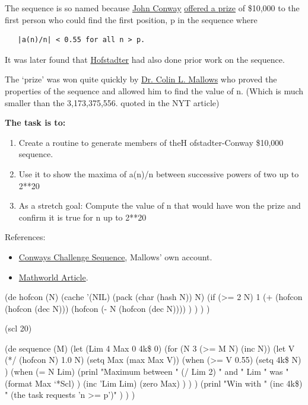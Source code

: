 \begin{itemize}
The sequence is so named because
\href{http://en.wikipedia.org/wiki/John\_Horton\_Conway}{John Conway}
\href{http://www.nytimes.com/1988/08/30/science/intellectual-duel-brash-challenge-swift-response.html}{offered
a prize} of \$10,000 to the first person who could find the first
position, p in the sequence where

\begin{verbatim}
   |a(n)/n| < 0.55 for all n > p.
\end{verbatim}

It was later found that
\href{http://en.wikipedia.org/wiki/Douglas\_Hofstadter}{Hofstadter} had
also done prior work on the sequence.

The `prize' was won quite quickly by
\href{http://www.research.avayalabs.com/gcm/usa/en-us/people/all/mallows.htm}{Dr.
Colin L. Mallows} who proved the properties of the sequence and allowed
him to find the value of n. (Which is much smaller than the
3,173,375,556. quoted in the NYT article)

\pagebreak{}
\textbf{The task is to:}

\begin{enumerate}
\item
  Create a routine to generate members of theH ofstadter-Conway \$10,000
  sequence.
\item
  Use it to show the maxima of a(n)/n between successive powers of two
  up to 2**20
\item
  As a stretch goal: Compute the value of n that would have won the
  prize and confirm it is true for n up to 2**20
\end{enumerate}

References:

\begin{itemize}
\item
  \href{http://www.jstor.org/stable/2324028}{Conways Challenge
  Sequence}, Mallows' own account.
\item
  \href{http://mathworld.wolfram.com/Hofstadter-Conway10000-DollarSequence.html}{Mathworld
  Article}.
\end{itemize}

\begin{wideverbatim}

(de hofcon (N)
   (cache '(NIL) (pack (char (hash N)) N)
      (if (>= 2 N)
         1
         (+
            (hofcon (hofcon (dec N)))
            (hofcon (- N (hofcon (dec N)))) ) ) ) )

(scl 20)

(de sequence (M)
   (let (Lim 4  Max 0  4k\$ 0)
      (for (N 3 (>= M N) (inc N))
         (let V (*/ (hofcon N) 1.0 N)
            (setq Max (max Max V))
            (when (>= V 0.55)
               (setq 4k\$ N) )
            (when (= N Lim)
               (prinl
                  "Maximum between " (/ Lim 2)
                  " and " Lim
                  " was " (format Max `*Scl) )
               (inc 'Lim Lim)
               (zero Max) ) ) )
      (prinl
         "Win with " (inc 4k\$)
         " (the task requests 'n >= p')" ) ) )


\end{wideverbatim}
\end{itemize}

